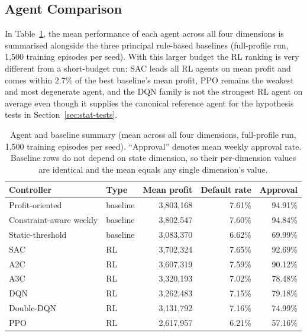 \documentclass[preprint,review,authoryear,12pt]{elsarticle}
\begin{document}
\subsection{Agent Comparison}
\label{sec:agent-comparison}

In Table~\ref{tab:agent-summary}, the mean performance of each agent across all four
dimensions is summarised alongside the three principal rule-based baselines (full-profile
run, 1{,}500 training episodes per seed). With this larger budget the RL ranking is very
different from a short-budget run: SAC leads all RL agents on mean profit and comes
within 2.7\% of the best baseline's mean profit, PPO remains the weakest and most
degenerate agent, and the DQN family is not the strongest RL agent on average even
though it supplies the canonical reference agent for the hypothesis tests in
Section~\ref{sec:stat-tests}.

\begin{table}[t]
    \centering
    \small
    \caption{Agent and baseline summary (mean across all four dimensions, full-profile
        run, 1{,}500 training episodes per seed). ``Approval'' denotes mean weekly approval
        rate. Baseline rows do not depend on state dimension, so their per-dimension values
        are identical and the mean equals any single dimension's value.}
    \label{tab:agent-summary}
    \begin{tabular}{l l r r r}
        \toprule
        Controller              & Type     & Mean profit   & Default rate & Approval \\
        \midrule
        Profit-oriented         & baseline & 3{,}803{,}168 & 7.61\%       & 94.91\%  \\
        Constraint-aware weekly & baseline & 3{,}802{,}547 & 7.60\%       & 94.84\%  \\
        Static-threshold        & baseline & 3{,}083{,}370 & 6.62\%       & 69.99\%  \\
        \midrule
        SAC                     & RL       & 3{,}702{,}324 & 7.65\%       & 92.69\%  \\
        A2C                     & RL       & 3{,}607{,}319 & 7.59\%       & 90.12\%  \\
        A3C                     & RL       & 3{,}320{,}193 & 7.02\%       & 78.48\%  \\
        DQN                     & RL       & 3{,}262{,}483 & 7.15\%       & 79.18\%  \\
        Double-DQN              & RL       & 3{,}131{,}792 & 7.16\%       & 74.99\%  \\
        PPO                     & RL       & 2{,}617{,}957 & 6.21\%       & 57.16\%  \\
        \bottomrule
    \end{tabular}
\end{table}
\end{document}
